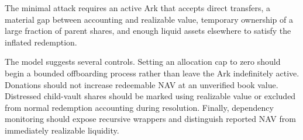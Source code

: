 \documentclass[11pt]{article}
\begin{document}
The minimal attack requires an active Ark that accepts direct transfers, a material gap between accounting and realizable value, temporary ownership of a large fraction of parent shares, and enough liquid assets elsewhere to satisfy the inflated redemption.

The model suggests several controls.  Setting an allocation cap to zero should begin a bounded offboarding process rather than leave the Ark indefinitely active.  Donations should not increase redeemable NAV at an unverified book value.  Distressed child-vault shares should be marked using realizable value or excluded from normal redemption accounting during resolution.  Finally, dependency monitoring should expose recursive wrappers and distinguish reported NAV from immediately realizable liquidity.
\end{document}
